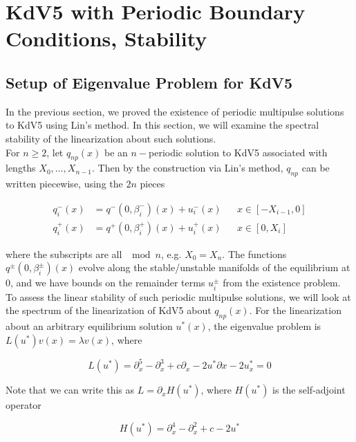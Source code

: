 \documentclass[12pt]{article}
\begin{document}
\section{KdV5 with Periodic Boundary Conditions, Stability}

\subsection{Setup of Eigenvalue Problem for KdV5}

In the previous section, we proved the existence of periodic multipulse solutions to KdV5 using Lin's method. In this section, we will examine the spectral stability of the linearization about such solutions.\\

For $n \geq 2$, let $q_{np}(x)$ be an $n-$periodic solution to KdV5 associated with lengths $X_0, \dots, X_{n-1}$. Then by the construction via Lin's method, $q_{np}$ can be written piecewise, using the $2n$ pieces

\begin{align*}
q_i^-(x) &= q^-(0, \beta_i^-)(x) + u_i^-(x) && x \in [-X_{i-1}, 0]\\
q_i^+(x) &= q^+(0, \beta_i^+)(x) + u_i^+(x) && x \in [0, X_i]
\end{align*}

where the subscripts are all $\mod n$, e.g. $X_0 = X_n$. The functions $q^\pm(0, \beta_i^\pm)(x)$ evolve along the stable/unstable manifolds of the equilibrium at 0, and we have bounds on the remainder terms $u_i^\pm$ from the existence problem.\\

To assess the linear stability of such periodic multipulse solutions, we will look at the spectrum of the linearization of KdV5 about $q_{np}(x)$. For the linearization about an arbitrary equilibrium solution $u^*(x)$, the eigenvalue problem is $L(u^*) v(x) = \lambda v(x)$, where

\begin{equation}
L(u^*) = \partial_x^5 - \partial_x^3 + c \partial_x - 2 u^* \partial x - 2 u^*_x = 0
\end{equation}

Note that we can write this as $L = \partial_x H(u^*)$, where $H(u^*)$ is the self-adjoint operator

\begin{equation}
H(u^*) = \partial_x^4 - \partial_x^2 + c - 2 u^*
\end{equation}
\end{document}

